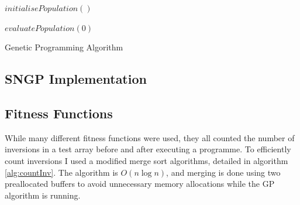 \documentclass{article}
\begin{document}
		\begin{algorithm}[H]
			
			$initialisePopulation()$
			
			$evaluatePopulation(0)$
			
		
				
			\caption{Genetic Programming Algorithm}
			
			\label{alg:GP}
		\end{algorithm}
		
		\subsection{SNGP Implementation}
		
		\subsection{Fitness Functions}
		
			While many different fitness functions were used, they all counted the number of inversions in a test array before and after executing a programme. To efficiently count inversions I used a modified merge sort algorithms, detailed in algorithm \ref{alg:countInv}. The algorithm is $O(n\log{}n)$, and merging is done using two preallocated buffers to avoid unnecessary memory allocations while the GP algorithm is running.
			
\end{document}
